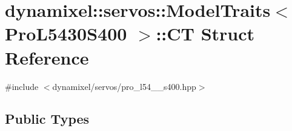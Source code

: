 \hypertarget{structdynamixel_1_1servos_1_1_model_traits_3_01_pro_l5430_s400_01_4_1_1_c_t}{}\section{dynamixel\+:\+:servos\+:\+:Model\+Traits$<$ Pro\+L5430\+S400 $>$\+:\+:C\+T Struct Reference}
\label{structdynamixel_1_1servos_1_1_model_traits_3_01_pro_l5430_s400_01_4_1_1_c_t}


{\ttfamily \#include $<$dynamixel/servos/pro\+\_\+l54\+\_\+\_\+s400.\+hpp$>$}

\subsection*{Public Types}
